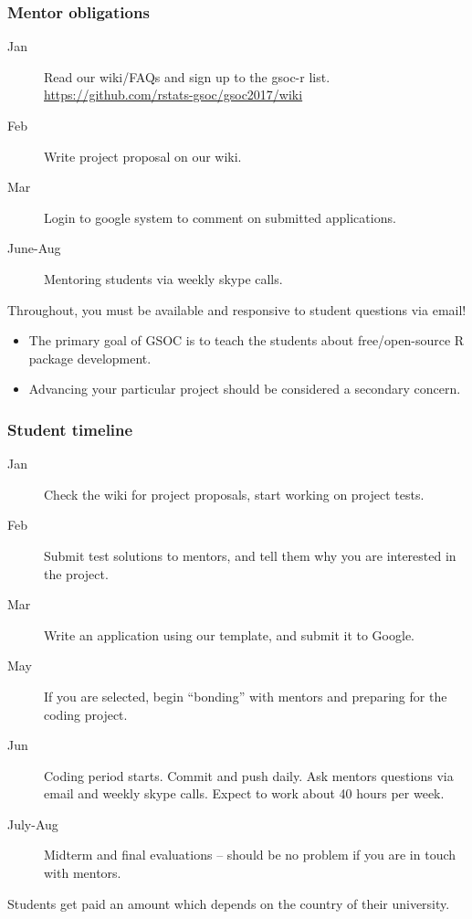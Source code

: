\documentclass{beamer}
\begin{document}
\begin{frame}
  \frametitle{Mentor obligations}
  \begin{description}
  \item[Jan] Read our wiki/FAQs and sign up to the gsoc-r list.\\
    {\small \url{https://github.com/rstats-gsoc/gsoc2017/wiki}}
  \item[Feb] Write project proposal on our wiki.
  \item[Mar] Login to google system to comment on submitted applications.
  \item[June-Aug] Mentoring students via weekly skype calls.
  \end{description}
  Throughout, you must be available and responsive to student
  questions via email! 
  \begin{itemize}
  \item The primary goal of GSOC is to teach the students about
    free/open-source R package development.
  \item Advancing your particular project should be considered a
    secondary concern.
  \end{itemize}
\end{frame}


\begin{frame}
  \frametitle{Student timeline}
  \begin{description}
  \item[Jan] Check the wiki for project proposals, start working on project tests.
  \item[Feb] Submit test solutions to mentors, and tell them why you
    are interested in the project.
  \item[Mar] Write an application using our template, and submit it to Google.
  \item[May] If you are selected, begin ``bonding'' with mentors and
    preparing for the coding project.
  \item[Jun] Coding period starts. Commit and push daily. Ask mentors
    questions via email and weekly skype calls. Expect to work about
    40 hours per week.
  \item[July-Aug] Midterm and final evaluations -- should be no
    problem if you are in touch with mentors.
  \end{description}

  Students get paid an amount which depends on the country of their
  university.
\end{frame}
\end{document}
